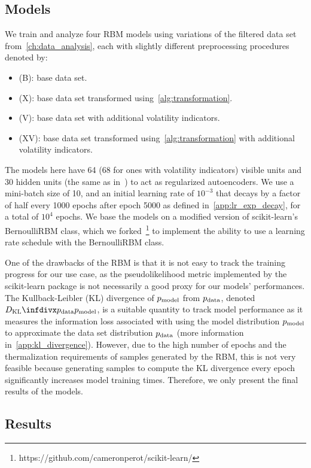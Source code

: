 \subsection{Models}
We train and analyze four RBM models using variations of the filtered data set from~\cref{ch:data_analysis}, each with slightly different preprocessing procedures denoted by:
\begin{itemize}
    \item (B): base data set.
    \item (X): base data set transformed using~\cref{alg:transformation}.
    \item (V): base data set with additional volatility indicators.
    \item (XV): base data set transformed using~\cref{alg:transformation} with additional volatility indicators.
\end{itemize}
The models here have 64 (68 for ones with volatility indicators) visible units and 30 hidden units (the same as in~\cite{kondratyev_2019}) to act as regularized autoencoders.
We use a mini-batch size of 10, and an initial learning rate of \( 10^{-3} \) that decays by a factor of half every 1000 epochs after epoch 5000 as defined in~\cref{app:lr_exp_decay}, for a total of \( 10^4 \) epochs.
We base the models on a modified version of scikit-learn's~\cite{python_sklearn} BernoulliRBM class, which we forked~\footnote{https://github.com/cameronperot/scikit-learn/} to implement the ability to use a learning rate schedule with the BernoulliRBM class.

One of the drawbacks of the RBM is that it is not easy to track the training progress for our use case, as the pseudolikelihood metric implemented by the scikit-learn package is not necessarily a good proxy for our models' performances.
The Kullback-Leibler (KL) divergence of \( p_{\text{model}} \) from \( p_{\text{data}} \), denoted \( \DKL{\pdata}{\pmodel} \), is a suitable quantity to track model performance as it measures the information loss associated with using the model distribution \( p_{\text{model}} \) to approximate the data set distribution \( p_{\text{data}} \) (more information in~\cref{app:kl_divergence}).
However, due to the high number of epochs and the thermalization requirements of samples generated by the RBM, this is not very feasible because generating samples to compute the KL divergence every epoch significantly increases model training times.
Therefore, we only present the final results of the models.

\subsection{Results}
